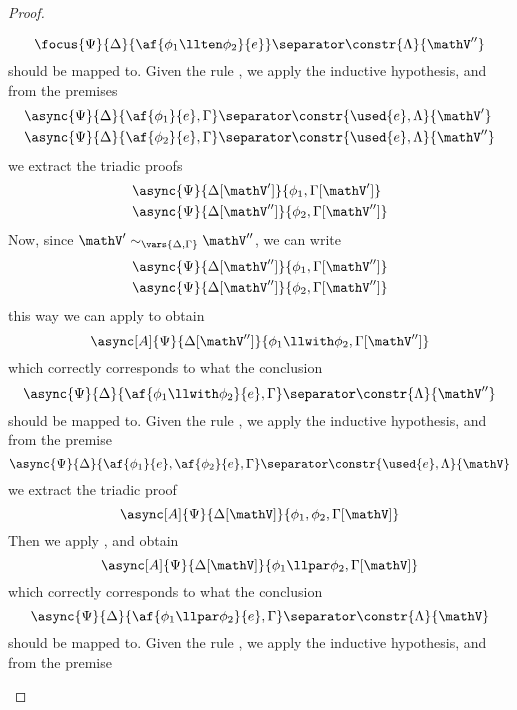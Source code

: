 \begin{proof}
\begin{itemize}
			$$ \focus{\Psi}{\Delta}{\af{\phi_1 \llten \phi_2}{e}} \separator \constr{\Lambda}{\mathV''} $$
			should be mapped to.
		\indCase{\displaywith} Given the rule \derRule{\displaywith}, we apply the inductive hypothesis, and from the premises
			\begin{align*}
				&\async{\Psi}{\Delta}{\af{\phi_1}{e}, \Gamma} \separator \constr{\used{e}, \Lambda}{\mathV'} \\
				&\async{\Psi}{\Delta}{\af{\phi_2}{e}, \Gamma} \separator \constr{\used{e}, \Lambda}{\mathV''} 
			\end{align*}
			we extract the triadic proofs
			\begin{align*}
			 	&\async{\Psi}{\Delta[\mathV']}{\phi_1, \Gamma[\mathV']}\\
			 	&\async{\Psi}{\Delta[\mathV'']}{\phi_2, \Gamma[\mathV'']} 
			\end{align*}
			Now, since $\mathV' \sim_{\vars{\Delta, \Gamma}} \mathV''$, we can write
			\begin{align*}
				&\async{\Psi}{\Delta[\mathV'']}{\phi_1, \Gamma[\mathV'']} \\
				&\async{\Psi}{\Delta[\mathV'']}{\phi_2, \Gamma[\mathV'']} 
			\end{align*}
			this way we can apply \derRule[A]{\displaywith} to obtain
			$$ \async[A]{\Psi}{\Delta[\mathV'']}{\phi_1 \llwith \phi_2, \Gamma[\mathV'']} $$
			which correctly corresponds to what the conclusion
			$$ \async{\Psi}{\Delta}{\af{\phi_1 \llwith \phi_2}{e}, \Gamma} \separator \constr{\Lambda}{\mathV''} $$
			should be mapped to.
		\indCase{\displaypar} Given the rule \derRule{\displaypar}, we apply the inductive hypothesis, and from the premise
			$$ \async{\Psi}{\Delta}{\af{\phi_1}{e}, \af{\phi_2}{e}, \Gamma} \separator \constr{\used{e}, \Lambda}{\mathV}$$
			we extract the triadic proof 
			$$\async[A]{\Psi}{\Delta[\mathV]}{\phi_1, \phi_2, \Gamma[\mathV]} $$
			Then we apply \derRule[A]{\displaypar}, and obtain
			$$\async[A]{\Psi}{\Delta[\mathV]}{\phi_1 \llpar \phi_2, \Gamma[\mathV]} $$
			which correctly corresponds to what the conclusion
			$$ \async{\Psi}{\Delta}{\af{\phi_1 \llpar \phi_2}{e}, \Gamma} \separator \constr{\Lambda}{\mathV} $$
			should be mapped to.
		\indCase{\displayplus[L]} Given the rule \derRule{\displayplus[L]}, we apply the inductive hypothesis, and from the premise

\end{itemize}
\end{proof}
